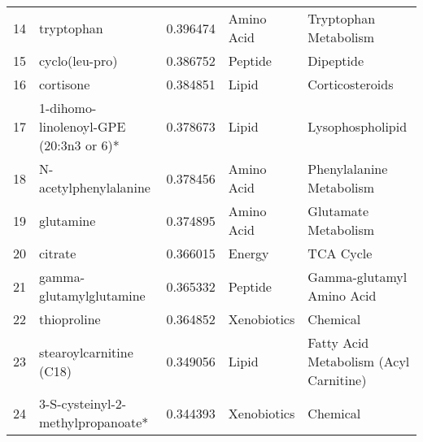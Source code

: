 \begin{tabular}{llrll}
14 &                              tryptophan &            0.396474 &    Amino Acid &                        Tryptophan Metabolism \\
15 &                          cyclo(leu-pro) &            0.386752 &       Peptide &                                    Dipeptide \\
16 &                               cortisone &            0.384851 &         Lipid &                              Corticosteroids \\
17 &  1-dihomo-linolenoyl-GPE (20:3n3 or 6)* &            0.378673 &         Lipid &                             Lysophospholipid \\
18 &                   N-acetylphenylalanine &            0.378456 &    Amino Acid &                     Phenylalanine Metabolism \\
19 &                               glutamine &            0.374895 &    Amino Acid &                         Glutamate Metabolism \\
20 &                                 citrate &            0.366015 &        Energy &                                    TCA Cycle \\
21 &                 gamma-glutamylglutamine &            0.365332 &       Peptide &                    Gamma-glutamyl Amino Acid \\
22 &                             thioproline &            0.364852 &   Xenobiotics &                                     Chemical \\
23 &                 stearoylcarnitine (C18) &            0.349056 &         Lipid &       Fatty Acid Metabolism (Acyl Carnitine) \\
24 &       3-S-cysteinyl-2-methylpropanoate* &            0.344393 &   Xenobiotics &                                     Chemical \\
\bottomrule
\end{tabular}
